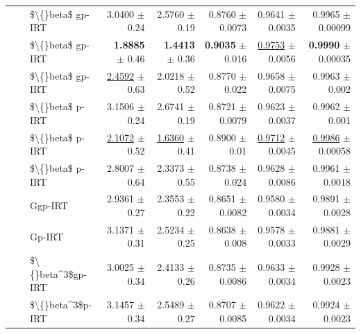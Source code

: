 \begin{longtable}{llp{}rrrrr}
 &  & \$\textbackslash\{\}beta\$ gp-IRT & 3.0400 {\scriptsize $\pm$ 0.24} & 2.5760 {\scriptsize $\pm$ 0.19} & 0.8760 {\scriptsize $\pm$ 0.0073} & 0.9641 {\scriptsize $\pm$ 0.0035} & 0.9965 {\scriptsize $\pm$ 0.00099} \\
 &  & \$\textbackslash\{\}beta\$ gp-IRT & \textbf{1.8885} {\scriptsize $\pm$ 0.46} & \textbf{1.4413} {\scriptsize $\pm$ 0.36} & \textbf{0.9035} {\scriptsize $\pm$ 0.016} & \underline{0.9753} {\scriptsize $\pm$ 0.0056} & \textbf{0.9990} {\scriptsize $\pm$ 0.00035} \\
 &  & \$\textbackslash\{\}beta\$ gp-IRT & \underline{2.4592} {\scriptsize $\pm$ 0.63} & 2.0218 {\scriptsize $\pm$ 0.52} & 0.8770 {\scriptsize $\pm$ 0.022} & 0.9658 {\scriptsize $\pm$ 0.0075} & 0.9963 {\scriptsize $\pm$ 0.002} \\
 &  & \$\textbackslash\{\}beta\$ p-IRT & 3.1506 {\scriptsize $\pm$ 0.24} & 2.6741 {\scriptsize $\pm$ 0.19} & 0.8721 {\scriptsize $\pm$ 0.0079} & 0.9623 {\scriptsize $\pm$ 0.0037} & 0.9962 {\scriptsize $\pm$ 0.001} \\
 &  & \$\textbackslash\{\}beta\$ p-IRT & \underline{2.1072} {\scriptsize $\pm$ 0.52} & \underline{1.6360} {\scriptsize $\pm$ 0.41} & 0.8900 {\scriptsize $\pm$ 0.01} & \underline{0.9712} {\scriptsize $\pm$ 0.0045} & \underline{0.9986} {\scriptsize $\pm$ 0.00058} \\
 &  & \$\textbackslash\{\}beta\$ p-IRT & 2.8007 {\scriptsize $\pm$ 0.64} & 2.3373 {\scriptsize $\pm$ 0.55} & 0.8738 {\scriptsize $\pm$ 0.024} & 0.9628 {\scriptsize $\pm$ 0.0086} & 0.9961 {\scriptsize $\pm$ 0.0018} \\
 &  & Ggp-IRT & 2.9361 {\scriptsize $\pm$ 0.27} & 2.3553 {\scriptsize $\pm$ 0.22} & 0.8651 {\scriptsize $\pm$ 0.0082} & 0.9580 {\scriptsize $\pm$ 0.0034} & 0.9891 {\scriptsize $\pm$ 0.0028} \\
 &  & Gp-IRT & 3.1371 {\scriptsize $\pm$ 0.31} & 2.5234 {\scriptsize $\pm$ 0.25} & 0.8638 {\scriptsize $\pm$ 0.008} & 0.9578 {\scriptsize $\pm$ 0.0033} & 0.9881 {\scriptsize $\pm$ 0.0029} \\
 &  & \$\textbackslash\{\}beta\textasciicircum{}3\$gp-IRT & 3.0025 {\scriptsize $\pm$ 0.34} & 2.4133 {\scriptsize $\pm$ 0.26} & 0.8735 {\scriptsize $\pm$ 0.0086} & 0.9633 {\scriptsize $\pm$ 0.0034} & 0.9928 {\scriptsize $\pm$ 0.0023} \\
 &  & \$\textbackslash\{\}beta\textasciicircum{}3\$p-IRT & 3.1457 {\scriptsize $\pm$ 0.34} & 2.5489 {\scriptsize $\pm$ 0.27} & 0.8707 {\scriptsize $\pm$ 0.0085} & 0.9622 {\scriptsize $\pm$ 0.0034} & 0.9924 {\scriptsize $\pm$ 0.0023} \\

\end{longtable}
